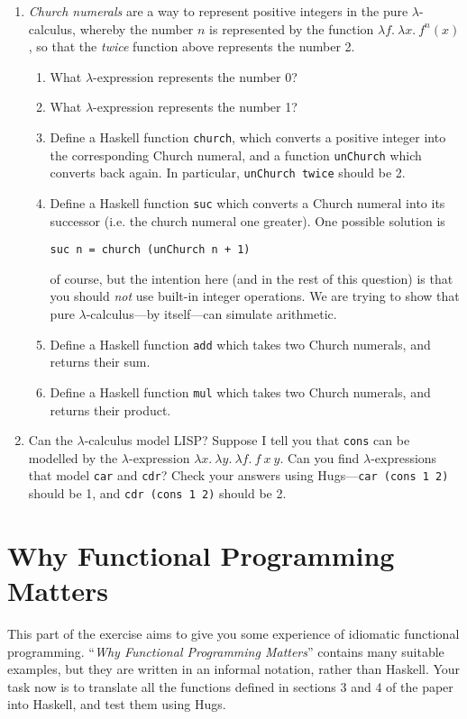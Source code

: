 \documentclass{article}
\begin{document}
\begin{enumerate}
\item
{\em Church numerals} are a way to represent positive integers in the
pure $\lambda$-calculus, whereby the number $n$ is represented by the
function $\lambda f.~\lambda x.~f^n(x)$, so that the {\it twice}
function above represents the number 2.
\begin{enumerate}
\item
What $\lambda$-expression represents the number 0? 
\item
What $\lambda$-expression represents the number 1? 
\item 
Define a Haskell function \verb!church!, which converts a positive
integer into the corresponding Church numeral, and a function
\verb!unChurch! which converts back again. In particular,
\verb!unChurch twice! should be 2. 
\item 
Define a Haskell function \verb!suc! which converts a Church numeral
into its successor (i.e. the church numeral one greater). One possible
solution is 
\begin{verbatim}
suc n = church (unChurch n + 1)
\end{verbatim}
of course, but the intention here (and in the rest of this question)
is that you should {\em not} use built-in integer operations. We are
trying to show that pure $\lambda$-calculus---by itself---can simulate
arithmetic. 
\item 
Define a Haskell function \verb!add! which takes two Church numerals,
and returns their sum. 
\item 
Define a Haskell function \verb!mul! which takes two Church numerals,
and returns their product. 
\end{enumerate}
\item 
Can the $\lambda$-calculus model LISP? Suppose I tell you that
\verb!cons! can be modelled by the $\lambda$-expression $\lambda
x.~\lambda y.~\lambda f.~f~x~y$. Can you find $\lambda$-expressions
that model \verb!car! and \verb!cdr!? Check your answers using
Hugs---\verb!car (cons 1 2)! should be 1, and \verb!cdr (cons 1 2)!
should be 2.

\end{enumerate}


\section{Why Functional Programming Matters}
This part of the exercise aims to give you some experience of
idiomatic functional programming. ``{\em Why Functional Programming
  Matters}'' contains many suitable examples, but they are written in
an informal notation, rather than Haskell. Your task now is to translate
all the functions defined in sections 3 and 4 of the paper into
Haskell, and test them using Hugs.
\end{document}
